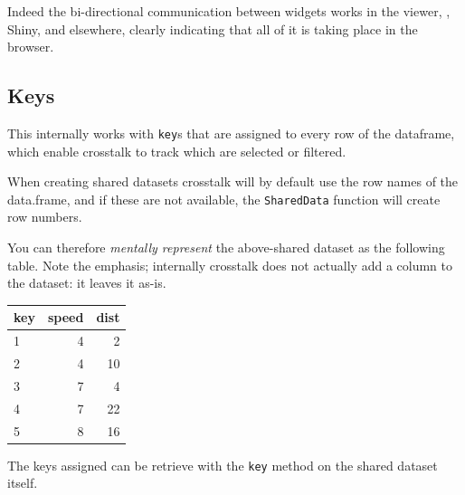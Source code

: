 \documentclass[10pt,]{krantz}
\makeatletter
\newenvironment{Shaded}{\begin{snugshade}}{\end{snugshade}}
\newcommand{\CommentTok}[1]{\textcolor[rgb]{0.37,0.37,0.37}{\textit{#1}}}
\newcommand{\DecValTok}[1]{\textcolor[rgb]{0.06,0.06,0.06}{#1}}
\newcommand{\KeywordTok}[1]{\textcolor[rgb]{0.27,0.27,0.27}{\textbf{#1}}}
\newcommand{\NormalTok}[1]{#1}
\newcommand{\OperatorTok}[1]{\textcolor[rgb]{0.43,0.43,0.43}{\textbf{#1}}}
\newcommand{\StringTok}[1]{\textcolor[rgb]{0.5,0.5,0.5}{#1}}
\newenvironment{kframe}{%
\medskip{}
\setlength{\fboxsep}{.8em}
 \def\at@end@of@kframe{}%
 \ifinner\ifhmode%
  \def\at@end@of@kframe{\end{minipage}}%
  \begin{minipage}{\columnwidth}%
 \fi\fi%
 \def\FrameCommand##1{\hskip\@totalleftmargin \hskip-\fboxsep
 \colorbox{shadecolor}{##1}\hskip-\fboxsep
     \hskip-\linewidth \hskip-\@totalleftmargin \hskip\columnwidth}%
 \MakeFramed {\advance\hsize-\width
   \@totalleftmargin\z@ \linewidth\hsize
   \@setminipage}}%
 {\par\unskip\endMakeFramed%
 \at@end@of@kframe}
\renewenvironment{Shaded}{\begin{kframe}}{\end{kframe}}
\makeatother
\begin{document}
Indeed the bi-directional communication between widgets works in the  viewer, , Shiny, and elsewhere, clearly indicating that all of it is taking place in the browser.

\hypertarget{linking-widgets-keys}{%
\subsection{Keys}\label{linking-widgets-keys}}

This internally works with \texttt{key}s that are assigned to every row of the dataframe, which enable crosstalk to track which are selected or filtered.

When creating shared datasets crosstalk will by default use the row names of the data.frame, and if these are not available, the \texttt{SharedData} function will create row numbers.

\begin{Shaded}
\end{Shaded}

You can therefore \emph{mentally represent} the above-shared dataset as the following table. Note the emphasis; internally crosstalk does not actually add a column to the dataset: it leaves it as-is.

\begin{tabular}{l|r|r}
\hline
key & speed & dist\\
\hline
1 & 4 & 2\\
\hline
2 & 4 & 10\\
\hline
3 & 7 & 4\\
\hline
4 & 7 & 22\\
\hline
5 & 8 & 16\\
\hline
\end{tabular}

The keys assigned can be retrieve with the \texttt{key} method on the shared dataset itself.

\begin{Shaded}
\end{Shaded}
\end{document}
